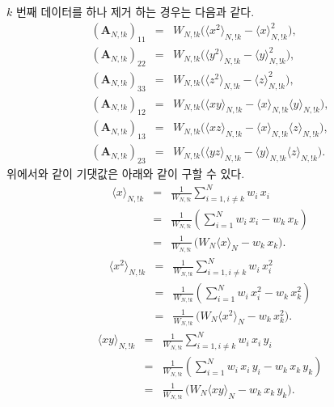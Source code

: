 \documentclass[chapter,a4paper,10pt]{oblivoir}
\begin{document}
$k$ 번째 데이터를 하나 제거 하는 경우는 다음과 같다.
\begin{eqnarray}
\left(\mathbf{A}_{N,!k}\right)_{11} &=& W_{N,!k}\Big(\langle x^2 \rangle_{N,!k} -\langle x \rangle_{N,!k}^2\Big), \\
\left(\mathbf{A}_{N,!k}\right)_{22} &=& W_{N,!k}\Big(\langle y^2 \rangle_{N,!k} -\langle y \rangle_{N,!k}^2\Big), \\
\left(\mathbf{A}_{N,!k}\right)_{33} &=& W_{N,!k}\Big(\langle z^2 \rangle_{N,!k} -\langle z \rangle_{N,!k}^2\Big), \\
\left(\mathbf{A}_{N,!k}\right)_{12} &=& W_{N,!k} \Big(\langle xy \rangle_{N,!k} -\langle x \rangle_{N,!k}\langle y \rangle_{N,!k}\Big), \\
\left(\mathbf{A}_{N,!k}\right)_{13} &=& W_{N,!k} \Big(\langle xz \rangle_{N,!k} -\langle x \rangle_{N,!k}\langle z \rangle_{N,!k}\Big), \\
\left(\mathbf{A}_{N,!k}\right)_{23} &=& W_{N,!k} \Big(\langle yz \rangle_{N,!k} -\langle y \rangle_{N,!k}\langle z \rangle_{N,!k}\Big). 
\end{eqnarray}
위에서와 같이 기댓값은 아래와 같이 구할 수 있다.
\begin{eqnarray}
\langle x \rangle_{N,!k} &=& \frac{1}{W_{N,!k}}\sum_{i=1, i\neq k}^{N}w_i\,x_i \\
&=& \frac{1}{W_{N,!k}}\left(\sum_{i=1}^{N}w_i\,x_i - w_{k}\,x_{k}\right)\nonumber\\
&=& \frac{1}{W_{N,!k}}\,\Big(W_N\langle x \rangle_N - w_{k}\,x_{k}\Big).\nonumber
\end{eqnarray}
\begin{eqnarray}
\langle x^2 \rangle_{N,!k} &=& \frac{1}{W_{N,!k}}\sum_{i=1, i\neq k}^{N}w_i\,x_i^2 \\
&=& \frac{1}{W_{N,!k}}\left(\sum_{i=1}^{N}w_i\,x_i^2 - w_{k}\,x_{k}^2\right)\nonumber\\
&=& \frac{1}{W_{N,!k}}\,\Big(W_N\langle x^2 \rangle_N - w_{k}\,x_{k}^2\Big).\nonumber
\end{eqnarray}
\begin{eqnarray}
\langle xy \rangle_{N,!k} &=& \frac{1}{W_{N,!k}}\sum_{i=1, i\neq k}^{N}w_i\,x_i\,y_i \\
&=& \frac{1}{W_{N,!k}}\left(\sum_{i=1}^{N}w_i\,x_i\,y_i - w_{k}\,x_{k}\,y_{k}\right)\nonumber\\
&=& \frac{1}{W_{N,!k}}\,\Big(W_N\langle xy \rangle_N - w_{k}\,x_{k}\,y_{k}\Big).\nonumber
\end{eqnarray}
\end{document}
